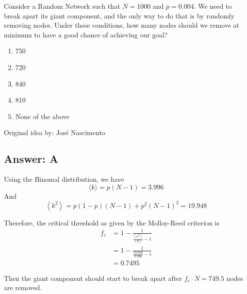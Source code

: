 
Consider a Random Network such that $N = 1000$ and $p = 0.004$. We need to break apart its giant component, and the only way to do that is by randomly removing nodes. Under these conditions, how many nodes should we remove at minimum to have a good chance of achieving our goal?

\begin{enumerate}[label={\Alph*.}]
    \item 750
    \item 720
    \item 840
    \item 810
    \item None of the above
\end{enumerate}

Original idea by: José Nascimento


\subsection*{Answer: A}

Using the Binomal distribution, we have \[
    \langle k \rangle = p (N - 1) = 3.996
\] And \[
    \left\langle k^2 \right\rangle = p (1-p) (N-1) + p^2 (N-1)^2 = 19.948
\]

Therefore, the critical threshold as given by the Molloy-Reed criterion is
\begin{align*}
    f_c &= 1 - \frac{1}{\frac{\left\langle k^2 \right\rangle}{\left\langle k \right\rangle} - 1} \\
    &= 1 - \frac{1}{\frac{19.948}{3.996} - 1} \\
    &= 0.7495
\end{align*}

Then the giant component should start to break apart after $f_c \cdot N = 749.5$ nodes are removed.
